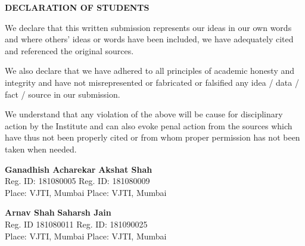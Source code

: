 \begin{center}
    {\textbf{DECLARATION OF STUDENTS}}\\ \vspace{1cm}
\end{center}
\par We declare that this written submission represents our ideas in our own words and where others' ideas or words have been included, we have adequately cited and referenced the original sources.
 
\par We also declare that we have adhered to all principles of academic honesty and integrity and have not misrepresented or fabricated or falsified any idea / data / fact / source in our submission. 

\par We understand that any violation of the above will be cause for disciplinary action by the Institute and can also evoke penal action from the sources which have thus not been properly cited or from whom proper permission has not been taken when needed. 



\vspace{2cm}
\textbf{Ganadhish Acharekar}
\hfill
\textbf{Akshat Shah} \\
\indent Reg. ID: 181080005
\hfill
Reg. ID: 181080009 \\
\indent Place: VJTI, Mumbai 
\hfill
Place: VJTI, Mumbai  \par

\vspace{2cm}
\textbf{Arnav Shah}
\hfill
\textbf{Saharsh Jain} \\
\indent Reg. ID 181080011
\hfill
Reg. ID: 181090025 \\
\indent Place: VJTI, Mumbai 
\hfill
Place: VJTI, Mumbai \par